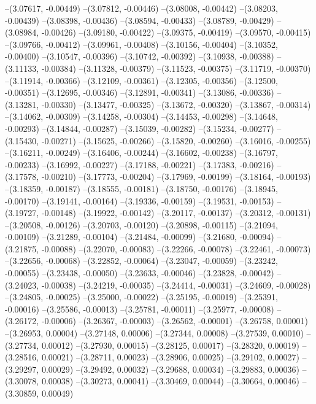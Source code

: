 --(3.07617, -0.00449)
--(3.07812, -0.00446)
--(3.08008, -0.00442)
--(3.08203, -0.00439)
--(3.08398, -0.00436)
--(3.08594, -0.00433)
--(3.08789, -0.00429)
--(3.08984, -0.00426)
--(3.09180, -0.00422)
--(3.09375, -0.00419)
--(3.09570, -0.00415)
--(3.09766, -0.00412)
--(3.09961, -0.00408)
--(3.10156, -0.00404)
--(3.10352, -0.00400)
--(3.10547, -0.00396)
--(3.10742, -0.00392)
--(3.10938, -0.00388)
--(3.11133, -0.00384)
--(3.11328, -0.00379)
--(3.11523, -0.00375)
--(3.11719, -0.00370)
--(3.11914, -0.00366)
--(3.12109, -0.00361)
--(3.12305, -0.00356)
--(3.12500, -0.00351)
--(3.12695, -0.00346)
--(3.12891, -0.00341)
--(3.13086, -0.00336)
--(3.13281, -0.00330)
--(3.13477, -0.00325)
--(3.13672, -0.00320)
--(3.13867, -0.00314)
--(3.14062, -0.00309)
--(3.14258, -0.00304)
--(3.14453, -0.00298)
--(3.14648, -0.00293)
--(3.14844, -0.00287)
--(3.15039, -0.00282)
--(3.15234, -0.00277)
--(3.15430, -0.00271)
--(3.15625, -0.00266)
--(3.15820, -0.00260)
--(3.16016, -0.00255)
--(3.16211, -0.00249)
--(3.16406, -0.00244)
--(3.16602, -0.00238)
--(3.16797, -0.00233)
--(3.16992, -0.00227)
--(3.17188, -0.00221)
--(3.17383, -0.00216)
--(3.17578, -0.00210)
--(3.17773, -0.00204)
--(3.17969, -0.00199)
--(3.18164, -0.00193)
--(3.18359, -0.00187)
--(3.18555, -0.00181)
--(3.18750, -0.00176)
--(3.18945, -0.00170)
--(3.19141, -0.00164)
--(3.19336, -0.00159)
--(3.19531, -0.00153)
--(3.19727, -0.00148)
--(3.19922, -0.00142)
--(3.20117, -0.00137)
--(3.20312, -0.00131)
--(3.20508, -0.00126)
--(3.20703, -0.00120)
--(3.20898, -0.00115)
--(3.21094, -0.00109)
--(3.21289, -0.00104)
--(3.21484, -0.00099)
--(3.21680, -0.00094)
--(3.21875, -0.00088)
--(3.22070, -0.00083)
--(3.22266, -0.00078)
--(3.22461, -0.00073)
--(3.22656, -0.00068)
--(3.22852, -0.00064)
--(3.23047, -0.00059)
--(3.23242, -0.00055)
--(3.23438, -0.00050)
--(3.23633, -0.00046)
--(3.23828, -0.00042)
--(3.24023, -0.00038)
--(3.24219, -0.00035)
--(3.24414, -0.00031)
--(3.24609, -0.00028)
--(3.24805, -0.00025)
--(3.25000, -0.00022)
--(3.25195, -0.00019)
--(3.25391, -0.00016)
--(3.25586, -0.00013)
--(3.25781, -0.00011)
--(3.25977, -0.00008)
--(3.26172, -0.00006)
--(3.26367, -0.00003)
--(3.26562, -0.00001)
--(3.26758, 0.00001)
--(3.26953, 0.00004)
--(3.27148, 0.00006)
--(3.27344, 0.00008)
--(3.27539, 0.00010)
--(3.27734, 0.00012)
--(3.27930, 0.00015)
--(3.28125, 0.00017)
--(3.28320, 0.00019)
--(3.28516, 0.00021)
--(3.28711, 0.00023)
--(3.28906, 0.00025)
--(3.29102, 0.00027)
--(3.29297, 0.00029)
--(3.29492, 0.00032)
--(3.29688, 0.00034)
--(3.29883, 0.00036)
--(3.30078, 0.00038)
--(3.30273, 0.00041)
--(3.30469, 0.00044)
--(3.30664, 0.00046)
--(3.30859, 0.00049)
